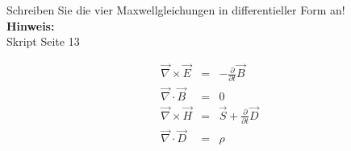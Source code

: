 \begin{question}[section=2,name={Maxwell differenziell},difficulty=,quantity=5,type=thr,tags={20151210,20130314,20060816}]
	Schreiben Sie die vier Maxwellgleichungen in differentieller Form an!
	\\ \textbf{Hinweis:}\\
	Skript Seite 13
\end{question}
\begin{solution}
	\begin{eqnarray}
		\vec{\nabla} \times \vec{E} & = & - \frac{\partial}{\partial t} \vec{B}\\
		\vec{\nabla} \cdot \vec{B} & = & 0\\
		\vec{\nabla} \times \vec{H} & = & \vec{S} + \frac{\partial}{\partial t} \vec{D}\\
		\vec{\nabla} \cdot \vec {D} & = & \rho
	\end{eqnarray}
\end{solution}
